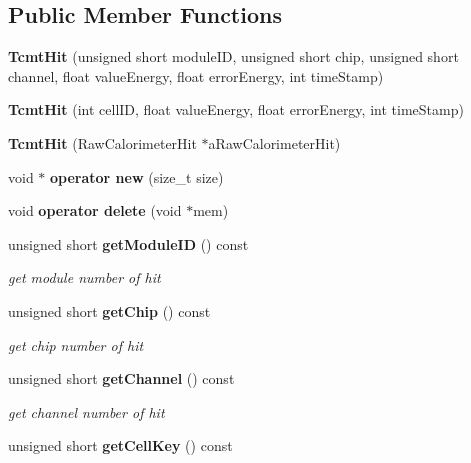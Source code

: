 \subsection*{Public Member Functions}
\begin{DoxyCompactItemize}
\item 
{\bfseries Tcmt\-Hit} (unsigned short module\-I\-D, unsigned short chip, unsigned short channel, float value\-Energy, float error\-Energy, int time\-Stamp)\label{classCALICE_1_1TcmtHit_abb8a261f961ee10a2dc2d253ccb0cdb2}

\item 
{\bfseries Tcmt\-Hit} (int cell\-I\-D, float value\-Energy, float error\-Energy, int time\-Stamp)\label{classCALICE_1_1TcmtHit_a265a19e5727e82a8c3d8c1d604e162fa}

\item 
{\bfseries Tcmt\-Hit} (Raw\-Calorimeter\-Hit $\ast$a\-Raw\-Calorimeter\-Hit)\label{classCALICE_1_1TcmtHit_acc0b872f3423b295638def9d971f9ba7}

\item 
void $\ast$ {\bfseries operator new} (size\-\_\-t size)\label{classCALICE_1_1TcmtHit_a0246257b5a12ea1f6b3c5041c0111cc4}

\item 
void {\bfseries operator delete} (void $\ast$mem)\label{classCALICE_1_1TcmtHit_a93e5f31de8d1849c6d2c9bccdd983688}

\item 
unsigned short {\bf get\-Module\-I\-D} () const \label{classCALICE_1_1TcmtHit_adca677a4368fde1737d4eb55883209ab}

\begin{DoxyCompactList}\small\item\em get module number of hit \end{DoxyCompactList}\item 
unsigned short {\bf get\-Chip} () const \label{classCALICE_1_1TcmtHit_a71000d9e9e46f88edafccb719e2762ae}

\begin{DoxyCompactList}\small\item\em get chip number of hit \end{DoxyCompactList}\item 
unsigned short {\bf get\-Channel} () const \label{classCALICE_1_1TcmtHit_a72d0083329b27506c0838feac47b1435}

\begin{DoxyCompactList}\small\item\em get channel number of hit \end{DoxyCompactList}\item 
unsigned short {\bf get\-Cell\-Key} () const \label{classCALICE_1_1TcmtHit_a8d393f1382e537632a585614a5f21000}


\end{DoxyCompactItemize}
